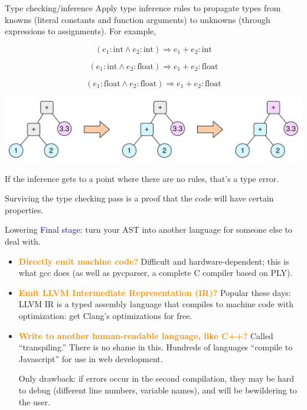 \documentclass[aspectratio=169]{beamer}
\begin{document}
\begin{frame}{Type checking/inference}
\vspace{0.35 cm}
Apply type inference rules to propagate types from knowns (literal constants and function arguments) to unknowns (through expressions to assignments). For example,

\vspace{-0.25 cm}
\[ (e_1: \mbox{int} \wedge e_2: \mbox{int}) \Rightarrow e_1 + e_2: \mbox{int} \]

\vspace{-0.5 cm}
\[ (e_1: \mbox{int} \wedge e_2: \mbox{float}) \Rightarrow e_1 + e_2: \mbox{float} \]

\vspace{-0.5 cm}
\[ (e_1: \mbox{float} \wedge e_2: \mbox{float}) \Rightarrow e_1 + e_2: \mbox{float} \]

\includegraphics[width=\linewidth]{type-inference.pdf}

\vspace{0.25 cm}
If the inference gets to a point where there are no rules, that's a type error.

\vspace{0.1 cm}
Surviving the type checking pass is a proof that the code will have certain properties.
\end{frame}

\begin{frame}{Lowering}
\vspace{0.5 cm}
\textcolor{darkblue}{Final stage:} turn your AST into another language for someone else to deal with.

\vspace{0.25 cm}
\begin{itemize}\setlength{\itemsep}{0.5 cm}
\item \textcolor{darkorange}{\bf Directly emit machine code?} Difficult and hardware-dependent; this is what gcc does (as well as pycparser, a complete C compiler based on PLY).

\item \textcolor{darkorange}{\bf Emit LLVM Intermediate Representation (IR)?} Popular these days: LLVM IR is a typed assembly language that compiles to machine code with optimization: get Clang's optimizations for free.

\item \textcolor{darkorange}{\bf Write to another human-readable language, like C++?} Called ``transpiling.'' There is no shame in this. Hundreds of languages ``compile to Javascript'' for use in web development.

\vspace{0.25 cm}
Only drawback: if errors occur in the second compilation, they may be hard to debug (different line numbers, variable names), and will be bewildering to the user.
\end{itemize}
\end{frame}
\end{document}
